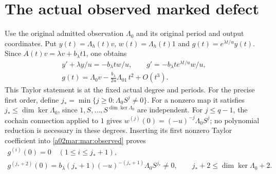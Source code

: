 \section{The actual observed marked defect}
Use the original admitted observation $\Lambda_0$ and its original
period and output coordinates. Put
$y(t)=\Lambda_h(t)v$, $w(t)=\Lambda_h(t)1$ and
$g(t)=e^{\lambda t/u}y(t)$. Since
$A(t)v=\lambda v+b_\lambda t1$, one obtains
\begin{equation}\tag{MAR20}\label{a02mar:mar:observed}
 \begin{gathered}
 y'+\lambda y/u=-b_\lambda t w/u,\qquad
 g'=-b_\lambda t e^{\lambda t/u}w/u,\\
 g(t)=\Lambda_0v-\frac{b_\lambda}{2u}\Lambda_01\,t^2+O(t^3).
 \end{gathered}
\end{equation}
This Taylor statement is at the fixed actual degree and periods.
For the precise first order, define
$j_* =\min\{j\ge0:\Lambda_0 S^j\ne0\}$.
For a nonzero map it satisfies $j_*\le\dim\ker\Lambda_0$,
since $1,S,\ldots,S^{\dim\ker\Lambda_0}$ are independent.
For $j\le q-1$, the cochain connection applied to $1$ gives
$w^{(j)}(0)=(-u)^{-j}\Lambda_0S^j$; no polynomial reduction
is necessary in these degrees. Inserting its first nonzero
Taylor coefficient into \eqref{a02mar:mar:observed} proves
\begin{equation}\tag{MAR21}\label{a02mar:mar:firstdefect}
 \begin{gathered}
 g^{(i)}(0)=0\quad(1\le i\le j_*+1),\\
 g^{(j_*+2)}(0)
   =b_\lambda(j_*+1)(-u)^{-(j_*+1)}\Lambda_0S^{j_*}\ne0,
 \qquad j_*+2\le\dim\ker\Lambda_0+2.
 \end{gathered}
\end{equation}


